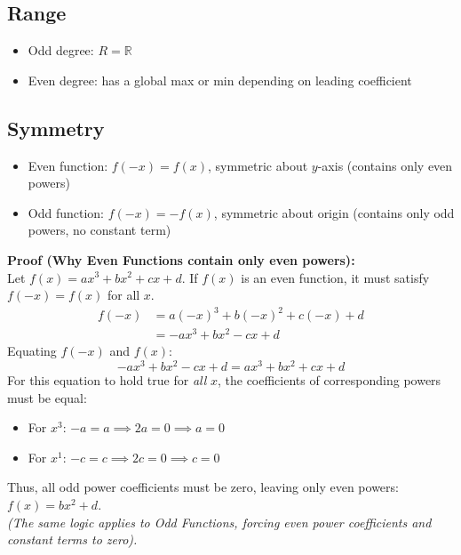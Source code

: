 \documentclass[12pt]{article}
\begin{document}
\subsection{Range}
\begin{itemize}
  \item Odd degree: $R = \mathbb{R}$
  \item Even degree: has a global max or min depending on leading coefficient
\end{itemize}

\subsection{Symmetry}
\begin{itemize}
  \item Even function: $f(-x) = f(x)$, symmetric about $y$-axis (contains only even powers)
  \item Odd function: $f(-x) = -f(x)$, symmetric about origin (contains only odd powers, no constant term)
\end{itemize}

\vspace{0.5em}
\noindent\textbf{Proof (Why Even Functions contain only even powers):} \\
Let $f(x) = ax^3 + bx^2 + cx + d$. If $f(x)$ is an even function, it must satisfy $f(-x) = f(x)$ for all $x$.
\begin{align*}
  f(-x) &= a(-x)^3 + b(-x)^2 + c(-x) + d \\
        &= -ax^3 + bx^2 - cx + d
\end{align*}
Equating $f(-x)$ and $f(x)$:
\[ -ax^3 + bx^2 - cx + d = ax^3 + bx^2 + cx + d \]
For this equation to hold true for \textit{all} $x$, the coefficients of corresponding powers must be equal:
\begin{itemize}
  \item For $x^3$: $-a = a \implies 2a = 0 \implies a = 0$
  \item For $x^1$: $-c = c \implies 2c = 0 \implies c = 0$ 
\end{itemize}
Thus, all odd power coefficients must be zero, leaving only even powers: $f(x) = bx^2 + d$. \\
\textit{(The same logic applies to Odd Functions, forcing even power coefficients and constant terms to zero).}
\end{document}
